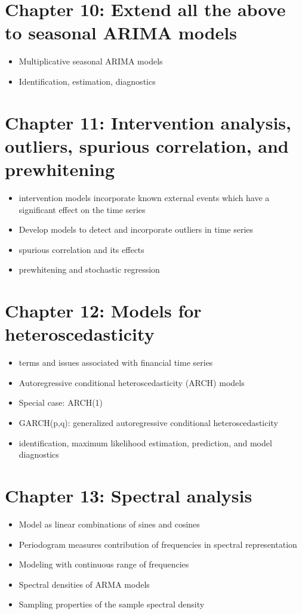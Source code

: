 \documentclass[12pt]{article}
\begin{document}
\section*{Chapter 10: Extend all the above to seasonal ARIMA models}
\label{sec-10}

\begin{itemize}
\item Multiplicative seasonal ARIMA models
\item Identification, estimation, diagnostics
\end{itemize}
\section*{Chapter 11: Intervention analysis, outliers, spurious correlation, and prewhitening}
\label{sec-11}

\begin{itemize}
\item intervention models incorporate known external events which have a significant effect on the time series
\item Develop models to detect and incorporate outliers in time series
\item spurious correlation and its effects
\item prewhitening and stochastic regression
\end{itemize}
\section*{Chapter 12: Models for heteroscedasticity}
\label{sec-12}

\begin{itemize}
\item terms and issues associated with financial time series
\item Autoregressive conditional heteroscedasticity (ARCH) models
\item Special case: ARCH(1)
\item GARCH(p,q): generalized autoregressive conditional heteroscedasticity
\item identification, maximum likelihood estimation, prediction, and model diagnostics
\end{itemize}
\section*{Chapter 13: Spectral analysis}
\label{sec-13}

\begin{itemize}
\item Model as linear combinations of sines and cosines
\item Periodogram measures contribution of frequencies in spectral representation
\item Modeling with continuous range of frequencies
\item Spectral densities of ARMA models
\item Sampling properties of the sample spectral density
\end{itemize}
\end{document}
